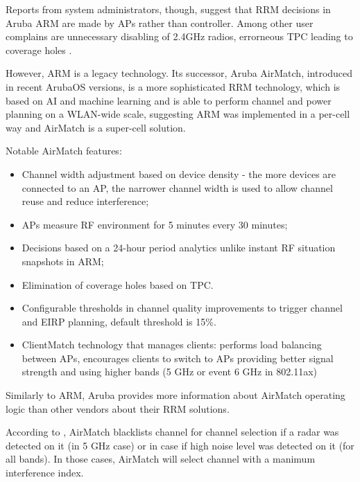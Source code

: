 Reports from system administrators, though, suggest that RRM decisions in Aruba ARM are made by APs rather than controller. Among other user complains are unnecessary disabling of 2.4GHz radios, errorneous TPC leading to coverage holes \cite{TamingArubaARM2012}.

However, ARM is a legacy technology. Its successor, Aruba AirMatch, introduced in recent ArubaOS versions, is a more sophisticated RRM technology, which is based on AI and machine learning and is able to perform channel and power planning on a WLAN-wide scale, suggesting ARM was implemented in a per-cell way and AirMatch is a super-cell solution.

Notable AirMatch features:

\begin{itemize}
    \item Channel width adjustment based on device density - the more devices are connected to an AP, the narrower channel width is used to allow channel reuse and reduce interference;
    \item APs measure RF environment for 5 minutes every 30 minutes;
    \item Decisions based on a 24-hour period analytics unlike instant RF situation snapshots in ARM;
    \item Elimination of coverage holes based on TPC.
    \item Configurable thresholds in channel quality improvements to trigger channel and EIRP planning, default threshold is 15\%.
    \item ClientMatch technology that manages clients: performs load balancing between APs, encourages clients to switch to APs providing better signal strength and using higher bands (5 GHz or event 6 GHz in 802.11ax)
\end{itemize}

Similarly to ARM, Aruba provides more information about AirMatch operating logic than other vendors about their RRM solutions.

According to \cite{ArubaOSUserGuide}, AirMatch blacklists channel for channel selection if a radar was detected on it (in 5 GHz case) or in case if high noise level was detected on it (for all bands). In those cases, AirMatch will select channel with a manimum interference index.

